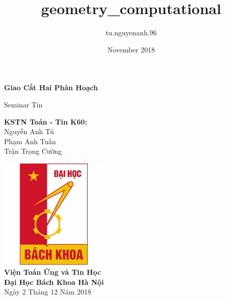 \documentclass[15pt]{article}
\title{geometry_computational}
\author{tu.nguyenanh.96 }
\date{November 2018}
\begin{document}
\begin{titlepage}
\newcommand{\Khung}[2]{
\begin{tabular}{|l|}
\hline\rule[-2ex]{0pt}{5.5ex}
\parbox{#1}{#2}\\
\hline
\end{tabular}
}
   \begin{center}
       \vspace*{1cm}
 
       {\huge \textbf{Giao Cắt Hai Phân Hoạch}}
 
       \vspace{0.5cm}
       {\LARGE Seminar Tin}
 
       \vspace{1.5cm}
 
       {\LARGE \textbf{KSTN Toán - Tin K60: \\}
       Nguyễn Anh Tú \\
       Phạm Anh Tuấn \\
       Trận Trọng Cường }
       \vspace{0.8cm}
       
       \includegraphics[width=0.4\textwidth]{bk_logo.jpg}\\[0.5cm]
 
       {\Large \textbf{Viện Toán Ứng và Tin Học}}\\[0.5cm]
       {\Large \textbf{Đại Học Bách Khoa Hà Nội}}\\[0.5cm]
       {\large Ngày 2 Tháng 12 Năm 2018}
 
   \end{center}
\end{titlepage}
{\Large \tableofcontents}
\newpage
\end{document}
